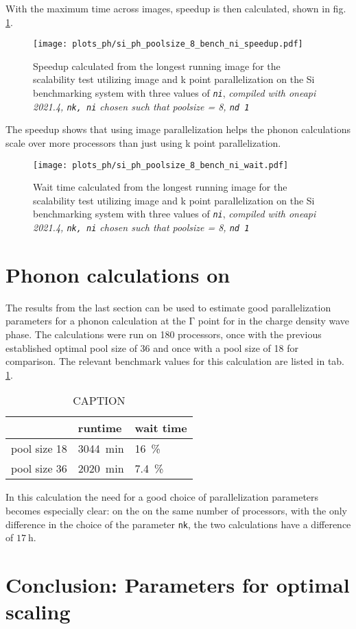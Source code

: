 \documentclass[main.tex]{subfiles}
\begin{document}
With the maximum time across images, speedup is then calculated, shown in fig. \ref{fig:scaling_ph_ni_poolsize_8_si}.

\begin{figure}[htb!]
    \centering
    \texttt{[image: plots\_ph/si\_ph\_poolsize\_8\_bench\_ni\_speedup.pdf]}
    \caption{Speedup calculated from the longest running image for the scalability test utilizing image and k point parallelization on the Si benchmarking system with three values of \emph{\texttt{ni}}, \emph{\QE compiled with \gls{oneapi} 2021.4, \texttt{nk, ni} chosen such that poolsize = 8, \texttt{nd 1}}}
    \label{fig:scaling_ph_ni_poolsize_8_si}
\end{figure}
The speedup shows that using image parallelization helps the phonon calculations scale over more processors than just using k point parallelization.


\begin{figure}[htb!]
    \centering
    \texttt{[image: plots\_ph/si\_ph\_poolsize\_8\_bench\_ni\_wait.pdf]}
    \caption{Wait time calculated from the longest running image for the scalability test utilizing image and k point parallelization on the Si benchmarking system with three values of \emph{\texttt{ni}}, \emph{\QE compiled with \gls{oneapi} 2021.4, \texttt{nk, ni} chosen such that poolsize = 8, \texttt{nd 1}}}
    \label{fig:scaling_ph_ni_poolsize_8_si_wait}
\end{figure}

\clearpage
\section{Phonon calculations on \TaS}

The results from the last section can be used to estimate good parallelization parameters for a phonon calculation at the \(\mathrm{\Gamma}\) point for \TaS in the charge density wave phase.
The calculations were run on 180 processors, once with the previous established optimal pool size of 36 and once with a pool size of 18 for comparison.
The relevant benchmark values for this calculation are listed in tab. \ref{tab:tas2_cdw_phonon_times}.

\begin{table}[ht!]
    \caption{CAPTION}
    \begin{tabular}{@{}lll@{}}
    \toprule
                 & runtime            & wait time \\ \midrule
    pool size 18 & \SI{3044}{\minute} & \SI{16}{\percent}         \\
    pool size 36 & \SI{2020}{\minute} & \SI{7.4}{\percent}
    \end{tabular}
    \label{tab:tas2_cdw_phonon_times}
\end{table}
In this calculation the need for a good choice of parallelization parameters becomes especially clear:
on the on the same number of processors, with the only difference in the choice of the parameter \texttt{nk}, the two calculations have a difference of \(\SI{17}{\hour}\).

\section{Conclusion: Parameters for optimal scaling}
\end{document}
